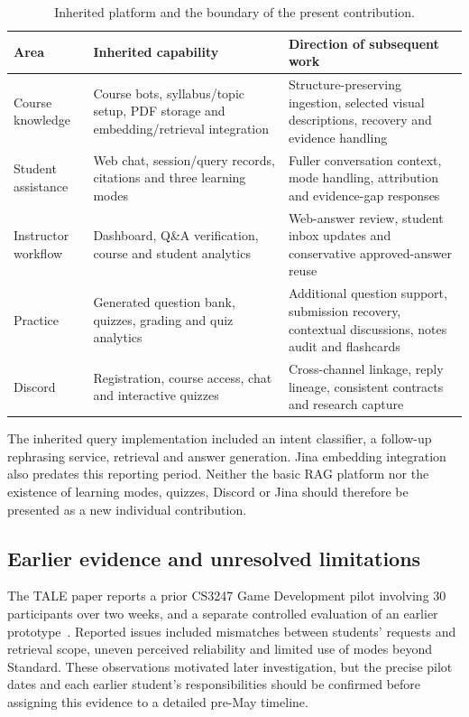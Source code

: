 \documentclass[11pt,a4paper]{article}
\begin{document}
\begin{table}[htbp]
\centering\small
\caption{Inherited platform and the boundary of the present contribution.}
\begin{tabularx}{\textwidth}{@{}P{0.23\textwidth}YY@{}}
\toprule
Area & Inherited capability & Direction of subsequent work\\
\midrule
Course knowledge & Course bots, syllabus/topic setup, PDF storage and embedding/retrieval integration & Structure-preserving ingestion, selected visual descriptions, recovery and evidence handling\\
Student assistance & Web chat, session/query records, citations and three learning modes & Fuller conversation context, mode handling, attribution and evidence-gap responses\\
Instructor workflow & Dashboard, Q\&A verification, course and student analytics & Web-answer review, student inbox updates and conservative approved-answer reuse\\
Practice & Generated question bank, quizzes, grading and quiz analytics & Additional question support, submission recovery, contextual discussions, notes audit and flashcards\\
Discord & Registration, course access, chat and interactive quizzes & Cross-channel linkage, reply lineage, consistent contracts and research capture\\
\bottomrule
\end{tabularx}
\end{table}

The inherited query implementation included an intent classifier, a follow-up rephrasing service, retrieval and answer generation. Jina embedding integration also predates this reporting period. Neither the basic RAG platform nor the existence of learning modes, quizzes, Discord or Jina should therefore be presented as a new individual contribution.

\subsection{Earlier evidence and unresolved limitations}
The TALE paper reports a prior CS3247 Game Development pilot involving 30 participants over two weeks, and a separate controlled evaluation of an earlier prototype~\cite{cragpaper}. Reported issues included mismatches between students' requests and retrieval scope, uneven perceived reliability and limited use of modes beyond Standard. These observations motivated later investigation, but the precise pilot dates and each earlier student's responsibilities should be confirmed before assigning this evidence to a detailed pre-May timeline.
\end{document}
